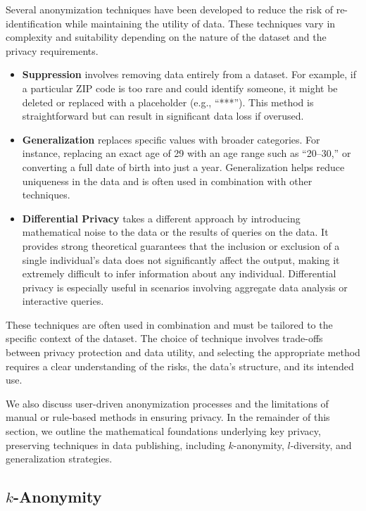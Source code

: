 \documentclass{article}
\begin{document}
Several anonymization techniques have been developed to reduce the risk of re-identification while maintaining the utility of data. These techniques vary in complexity and suitability depending on the nature of the dataset and the privacy requirements.

\begin{itemize}
\item \textbf{Suppression} involves removing data entirely from a dataset. For example, if a particular ZIP code is too rare and could identify someone, it might be deleted or replaced with a placeholder (e.g., “***”). This method is straightforward but can result in significant data loss if overused.

\item \textbf{Generalization} replaces specific values with broader categories. For instance, replacing an exact age of 29 with an age range such as “20–30,” or converting a full date of birth into just a year. Generalization helps reduce uniqueness in the data and is often used in combination with other techniques.

\item \textbf{Differential Privacy} takes a different approach by introducing mathematical noise to the data or the results of queries on the data. It provides strong theoretical guarantees that the inclusion or exclusion of a single individual’s data does not significantly affect the output, making it extremely difficult to infer information about any individual. Differential privacy is especially useful in scenarios involving aggregate data analysis or interactive queries.

\end{itemize}

These techniques are often used in combination and must be tailored to the specific context of the dataset. The choice of technique involves trade-offs between privacy protection and data utility, and selecting the appropriate method requires a clear understanding of the risks, the data's structure, and its intended use.


We also discuss user-driven anonymization processes and the limitations of manual or rule-based methods in ensuring privacy. In the remainder of this section, we outline the mathematical foundations underlying key privacy, preserving techniques in data publishing, including $k$-anonymity, $l$-diversity, and generalization strategies.

\subsection{$k$-Anonymity}
\end{document}
